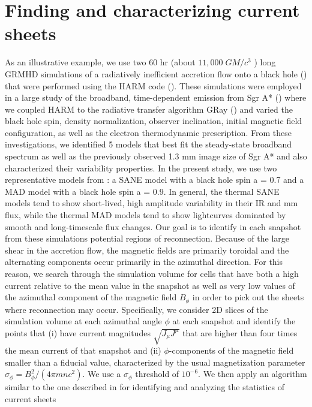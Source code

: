 \section{Finding and characterizing current sheets}
As an illustrative example, we use two 60 hr (about
$11,000 \; GM/c^3$
) long GRMHD simulations of a radiatively inefficient accretion flow onto a black hole
(\citealt{narayan2012}) that were
performed using the HARM code (\citealt{gammie2003}).
These simulations were employed in a large study of the
broadband, time-dependent emission from Sgr A* (\citealt{chan2015a,chan2015b}) where we coupled HARM to the radiative
transfer algorithm GRay (\citealt{chan2013}) and varied
the black hole spin, density normalization, observer inclination, initial magnetic field configuration, as well as
the electron thermodynamic prescription. From these
investigations, we identified 5 models that best fit the
steady-state broadband spectrum as well as the previously observed 1.3 mm image size of Sgr A* and also
characterized their variability properties. In the present
study, we use two representative models from \citet{chan2015b}: a SANE model with a black hole spin a = 0.7
and a MAD model with a black hole spin a = 0.9. In general, the thermal SANE models tend to show short-lived,
high amplitude variability in their IR and mm flux, while
the thermal MAD models tend to show lightcurves dominated by smooth and long-timescale flux changes.
Our goal is to identify in each snapshot from these simulations potential regions of reconnection. Because of the
large shear in the accretion flow, the magnetic fields are
primarily toroidal and the alternating components occur
primarily in the azimuthal direction. For this reason,
we search through the simulation volume for cells that
have both a high current relative to the mean value in
the snapshot as well as very low values of the azimuthal
component of the magnetic field $B_{\phi}$ in order to pick out
the sheets where reconnection may occur.
Specifically, we consider 2D slices of the simulation volume at each azimuthal angle $\phi$ at each snapshot and identify the points that (i) have current magnitudes $\sqrt{J_\mu J^\mu}$
that are higher than four times the mean current of that
snapshot and (ii) $\phi$-components of the magnetic field
smaller than a fiducial value, characterized by the usual
magnetization parameter $\sigma_\phi = B^2_{\phi}/(4 \pi m n c^2)$. We use a
$\sigma_\phi$ threshold of $10^{-6}$. We then apply an algorithm similar to the one described in \citet{zhdankin2013} for
identifying and analyzing the statistics of current sheets

